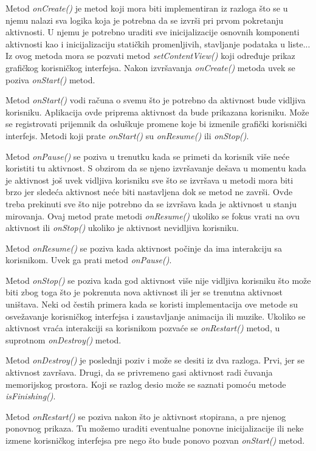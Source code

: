 \documentclass[android.tex]{subfiles}
\begin{document}
Metod \textit{onCreate()} je metod koji mora biti implementiran iz razloga što se u njemu nalazi sva logika koja je potrebna da se izvrši pri prvom pokretanju aktivnosti. U njemu je potrebno uraditi sve inicijalizacije osnovnih komponenti aktivnosti kao i inicijalizaciju statičkih promenljivih, stavljanje podataka u liste... Iz ovog metoda mora se pozvati metod \textit{setContentView()} koji određuje prikaz grafičkog korisničkog interfejsa. Nakon izvršavanja \textit{onCreate() }metoda uvek se poziva \textit{onStart()} metod.

Metod \textit{onStart() }vodi računa o svemu što je potrebno da aktivnost bude vidljiva korisniku. Aplikacija ovde priprema aktivnost da bude prikazana korisniku. Može se registrovati prijemnik da osluškuje promene koje bi izmenile grafički korisnički interfejs. Metodi koji prate \textit{onStart()} su \textit{onResume() }ili \textit{onStop()}.

Metod \textit{onPause()} se poziva u trenutku kada se primeti da korisnik više neće koristiti tu aktivnost. S obzirom da se njeno izvršavanje dešava u momentu kada je aktivnost još uvek vidljiva korisniku sve što se izvršava u metodi mora biti brzo jer sledeća aktivnost neće biti nastavljena dok se metod ne završi. Ovde treba prekinuti sve što nije potrebno da se izvršava kada je aktivnost u stanju mirovanja. Ovaj metod prate metodi \textit{onResume() }ukoliko se fokus vrati na ovu aktivnost ili \textit{onStop() }ukoliko je aktivnost nevidljiva korisniku.

Metod \textit{onResume()} se poziva kada aktivnost počinje da ima interakciju sa korisnikom. Uvek ga prati metod \textit{onPause()}.

Metod \textit{onStop()} se poziva kada god aktivnost više nije vidljiva korisniku što može biti zbog toga što je pokrenuta nova aktivnost ili jer se trenutna aktivnost uništava. Neki od čestih primera kada se koristi implementacija ove metode su osvežavanje korisničkog interfejsa i zaustavljanje animacija ili muzike. Ukoliko se aktivnost vraća interakciji sa korisnikom pozvaće se \textit{onRestart()} metod, u suprotnom \textit{onDestroy()} metod.

Metod \textit{onDestroy()} je poslednji poziv i može se desiti iz dva razloga. Prvi, jer se aktivnost završava. Drugi, da se privremeno gasi aktivnost radi čuvanja memorijskog prostora. Koji se razlog desio može se saznati pomoću metode \textit{isFinishing()}.

Metod \textit{onRestart() }se poziva nakon što je aktivnost stopirana, a pre njenog ponovnog prikaza. Tu možemo uraditi eventualne ponovne inicijalizacije ili neke izmene korisničkog interfejsa pre nego što bude ponovo pozvan \textit{onStart()} metod.
\end{document}
